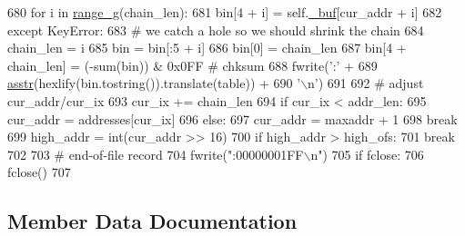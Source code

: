 \begin{DoxyCode}
680                         \textcolor{keywordflow}{for} i \textcolor{keywordflow}{in} \hyperlink{namespacesoftware_1_1chipwhisperer_1_1capture_1_1utils_1_1IntelHex_abac275d54b0c0dc47a6ef2f7c4f7bcdf}{range\_g}(chain\_len):
681                             bin[4 + i] = self.\hyperlink{classsoftware_1_1chipwhisperer_1_1capture_1_1utils_1_1IntelHex_1_1IntelHex_a9acc18c6165db7a6540c07688a8e09ac}{\_buf}[cur\_addr + i]
682                     \textcolor{keywordflow}{except} KeyError:
683                         \textcolor{comment}{# we catch a hole so we should shrink the chain}
684                         chain\_len = i
685                         bin = bin[:5 + i]
686                     bin[0] = chain\_len
687                     bin[4 + chain\_len] = (-sum(bin)) & 0x0FF  \textcolor{comment}{# chksum}
688                     fwrite(\textcolor{stringliteral}{':'} +
689                            \hyperlink{namespacesoftware_1_1chipwhisperer_1_1capture_1_1utils_1_1IntelHex_a32eb6deeafe6dba1f76d94543cff7528}{asstr}(hexlify(bin.tostring()).translate(table)) +
690                            \textcolor{stringliteral}{'\(\backslash\)n'})
691 
692                     \textcolor{comment}{# adjust cur\_addr/cur\_ix}
693                     cur\_ix += chain\_len
694                     \textcolor{keywordflow}{if} cur\_ix < addr\_len:
695                         cur\_addr = addresses[cur\_ix]
696                     \textcolor{keywordflow}{else}:
697                         cur\_addr = maxaddr + 1
698                         \textcolor{keywordflow}{break}
699                     high\_addr = int(cur\_addr >> 16)
700                     \textcolor{keywordflow}{if} high\_addr > high\_ofs:
701                         \textcolor{keywordflow}{break}
702 
703         \textcolor{comment}{# end-of-file record}
704         fwrite(\textcolor{stringliteral}{":00000001FF\(\backslash\)n"})
705         \textcolor{keywordflow}{if} fclose:
706             fclose()
707 
\end{DoxyCode}


\subsection{Member Data Documentation}
\hypertarget{classsoftware_1_1chipwhisperer_1_1capture_1_1utils_1_1IntelHex_1_1IntelHex_aedb3e9ce405494ffb08bfd4051c9bcc7}{}

